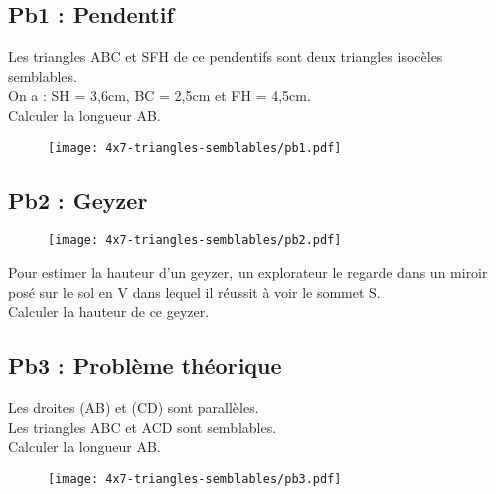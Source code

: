 \Pointilles[5]

\subsection*{Pb1 : Pendentif} 

\begin{multicols}{2}
Les triangles ABC et SFH de ce pendentifs sont deux triangles isocèles semblables. \\ 

On a : SH = 3,6cm, BC = 2,5cm et FH = 4,5cm. \\ 
Calculer la longueur AB.

\begin{figure}[H]
  \centering
  \texttt{[image: 4x7-triangles-semblables/pb1.pdf]}
\end{figure}

\end{multicols} 

\subsection*{Pb2 : Geyzer}

\begin{figure}[H]
  \centering
  \texttt{[image: 4x7-triangles-semblables/pb2.pdf]}
\end{figure}

Pour estimer la hauteur d'un geyzer, un explorateur le regarde dans un miroir posé sur le sol en V dans lequel il réussit à voir le sommet S. \\

Calculer la hauteur de ce geyzer.

\subsection*{Pb3 : Problème théorique}

\begin{multicols}{2}

  Les droites (AB) et (CD) sont parallèles. \\
  
  Les triangles ABC et ACD sont semblables. \\

  Calculer la longueur AB. 

\begin{figure}[H]
  \centering
  \texttt{[image: 4x7-triangles-semblables/pb3.pdf]}
\end{figure}



\end{multicols} 


